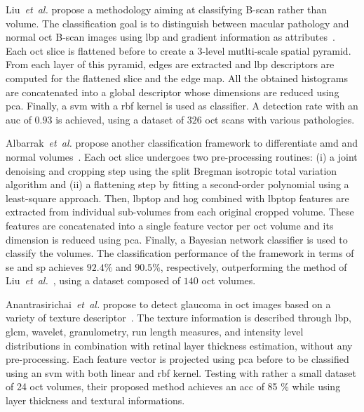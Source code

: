 %
Liu~\textit{et~al.} propose a methodology aiming at classifying B-scan rather than volume.
The classification goal is to distinguish between macular pathology and normal \gls{oct} B-scan images using \gls{lbp} and gradient information as attributes~\cite{Liu2011}.
%
Each \gls{oct} slice is flattened before to create a $3$-level mutlti-scale spatial pyramid.
From each layer of this pyramid, edges are extracted and \gls{lbp} descriptors are computed for the flattened slice and the edge map.
All the obtained histograms are concatenated into a global descriptor whose dimensions are reduced using \gls{pca}.
Finally, a \gls{svm} with a \gls{rbf} kernel is used as classifier.
%
A detection rate with an \gls{auc} of $0.93$ is achieved, using a dataset of $326$ \gls{oct} scans with various pathologies.

Albarrak~\textit{et~al.} propose another classification framework to differentiate \gls{amd} and normal volumes~\cite{albarrak2013age}.
%
Each \gls{oct} slice undergoes two pre-processing routines: (i) a joint denoising and cropping step using the split Bregman isotropic total variation algorithm and (ii) a flattening step by fitting a second-order polynomial using a least-square approach.
Then, \gls{lbptop} and \gls{hog} combined with \gls{lbptop} features are extracted from individual sub-volumes from each original cropped volume.
These features are concatenated into a single feature vector per \gls{oct} volume and its dimension is reduced using \gls{pca}.
Finally, a Bayesian network classifier is used to classify the volumes.
%
The classification performance of the framework in terms of \gls{se} and \gls{sp} achieves $92.4 \%$ and $90.5 \%$, respectively, outperforming the method of Liu~\emph{et~al.}~\cite{Liu2011}, using a dataset composed of $140$ \gls{oct} volumes.

Anantrasirichai~\textit{et~al.} propose to detect glaucoma in \gls{oct} images based on a variety of texture descriptor~\cite{anantrasirichai2013svm}.
%
The texture information is described through \gls{lbp}, \gls{glcm}, wavelet, granulometry, run length measures, and intensity level distributions in combination with retinal layer thickness estimation, without any pre-processing.
Each feature vector is projected using \gls{pca} before to be classified using an \gls{svm} with both linear and \gls{rbf} kernel.
%
Testing with rather a small dataset of 24 \gls{oct} volumes, their proposed method achieves an \gls{acc} of 85 \% while using layer thickness and textural informations.

